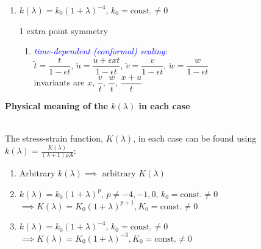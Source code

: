 \documentclass[landscape]{slides}
\def\myemph#1{\textcolor{blue}{\em #1}}
\def\const{\text{const.}}
\begin{document}
\begin{enumerate}
\begin{enumerate}[label=\roman*.]
invariants are $x$, $t^{\frac{2}{p}} v$, $t^{\frac{2}{p}} w$, $t^{\frac{2}{p}} (x+u)$ 
\end{enumerate}
\hfil

\item
$k(\lambda) = k_0 (1+\lambda)^{-4}$,
\quad
$k_0 =\const\neq 0$

1 extra point symmetry

\begin{enumerate}[label=\roman*.]

\item 
\myemph{time-dependent (conformal) scaling}:\\ 
$\tilde t = \dfrac{t}{1 - \epsilon t}$,
$\tilde u = \dfrac{u + \epsilon xt}{1 - \epsilon t}$, 
$\tilde v =\dfrac{v}{1 - \epsilon t}$,
$\tilde w = \dfrac{w}{1 - \epsilon t}$
\\

invariants are $x$, $\dfrac{v}{t}$, $\dfrac{w}{t}$, $\dfrac{x + u}{t}$
\end{enumerate}

\end{enumerate}

\newpage
\begin{center}
\textbf{Physical meaning of the $k(\lambda)$ in each case}
\end{center}
\hfil\\
The stress-strain function, $K(\lambda)$, in each case can be found using  $k(\lambda) = \frac{K(\lambda)}{(\lambda+1)\rho A}$: 
\\
\begin{enumerate}
\item 
Arbitrary $k(\lambda) \implies  \text{ arbitrary } K(\lambda)$

\item 
$k(\lambda) = k_0 (1+\lambda)^{p}$,
\quad
$p \neq -4, -1, 0$, 
\quad
$k_0 = \const \neq 0$ \\
$\implies K(\lambda) = K_0 (1+\lambda)^{p+1}, K_0 = \const \neq 0$

\item
$k(\lambda) = k_0 (1+\lambda)^{-4}$,
\quad
$k_0 =\const\neq 0$ \\
$\implies K(\lambda) = K_0 (1+\lambda)^{-3}, K_0 = \const \neq 0$

\end{enumerate}
\hfil 
\end{document}

